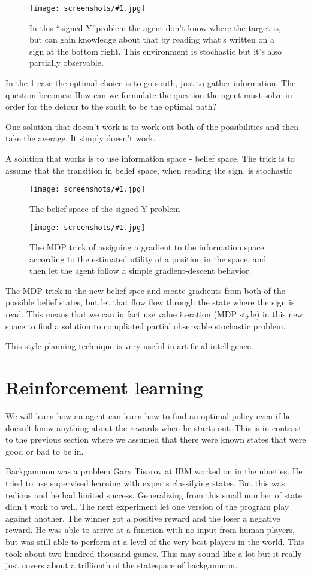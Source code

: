 \documentclass[a4, 12pt, english, USenglish]{scrreprt}
\newcommand{\screenshot}[2]{
\begin{figure}[htb]
\texttt{[image: screenshots/\#1.jpg]}
\label{#1}
\caption{#2}
\end{figure}}
\begin{document}
\screenshot{signedY}{In this ``signed Y''problem the agent don't know where the
  target is, but can gain knowledge about that by reading what's
  written on a sign at the bottom right. This environment is
  stochastic but it's also partially observable.}

In the \ref{signedY} case the optimal choice is to go south, just to
gather information.  The question becomes: How can we formulate the
question the agent must solve in order for the detour to the south to be the optimal
path?

One solution that doesn't work is to work out both of the
possibilities and then take the average. It simply doesn't work.

A solution that works is to use information space - belief space.  The
trick is to assume that the transition in belief space, when reading
the sign, is stochastic

\screenshot{signreadingbeliefspace}{The belief space of the  signed Y problem}

\screenshot{gradientMDPTrick}{The MDP trick of assigning a gradient to
the information space according to the estimated utility of a position
in the space, and then let the agent follow a simple gradient-descent behavior.}

The MDP trick in the new belief spce and create gradients from both of
the possible belief states, but let that flow flow through the state
where the sign is read. This means that we can in fact use value
iteration (MDP style) in this new space to find a solution to
compliated partial observable   stochastic problem.

This style planning technique is very useful in artificial
intelligence.

\chapter{Reinforcement learning}

We will learn how an agent can learn how to find an optimal policy
even if he doesn't know anything about the rewards when he starts
out.  This is in contrast to the previous section where we assumed
that there were known states that were good or bad to be in.

Backgammon was a problem Gary Tisarov at IBM worked on in the
nineties.  He tried to use supervised learning with experts
classifying states. But this was tedious and he had limited
success. Generalizing from this small number of state didn't work to
well. The next experiment let one version of the program play against
another.  The winner got a positive reward and the loser a negative
reward.  He was able to arrive at a function with no input from human
players, but was still able to perform at  a level of the very best
players in the world.   This took about two hundred thousand
games. This may sound like  a lot but it really just covers about a
trillionth of the statespace of backgammon.
\end{document}
